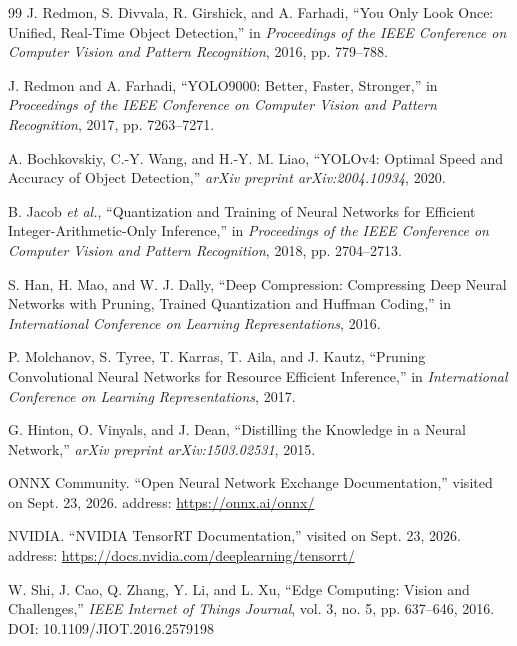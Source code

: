 \renewcommand{\bibname}{TÀI LIỆU THAM KHẢO}
\cleardoublepage
{}
\begin{thebibliography}{99}
 J. Redmon, S. Divvala, R. Girshick, and A. Farhadi, ``You Only Look
Once: Unified, Real-Time Object Detection,'' in \textit{Proceedings of the IEEE
Conference on Computer Vision and Pattern Recognition}, 2016, pp. 779--788.

 J. Redmon and A. Farhadi, ``YOLO9000: Better, Faster, Stronger,'' in
\textit{Proceedings of the IEEE Conference on Computer Vision and Pattern
Recognition}, 2017, pp. 7263--7271.

 A. Bochkovskiy, C.-Y. Wang, and H.-Y. M. Liao, ``YOLOv4: Optimal Speed
and Accuracy of Object Detection,'' \textit{arXiv preprint arXiv:2004.10934}, 2020.

 B. Jacob \textit{et al.}, ``Quantization and Training of Neural Networks for Efficient
Integer-Arithmetic-Only Inference,'' in \textit{Proceedings of the IEEE Conference
on Computer Vision and Pattern Recognition}, 2018, pp. 2704--2713.

 S. Han, H. Mao, and W. J. Dally, ``Deep Compression: Compressing Deep
Neural Networks with Pruning, Trained Quantization and Huffman Coding,''
in \textit{International Conference on Learning Representations}, 2016.

 P. Molchanov, S. Tyree, T. Karras, T. Aila, and J. Kautz,
``Pruning Convolutional Neural Networks for Resource Efficient Inference,''
in \textit{International Conference on Learning Representations}, 2017.

 G. Hinton, O. Vinyals, and J. Dean, ``Distilling the Knowledge in a Neural
Network,'' \textit{arXiv preprint arXiv:1503.02531}, 2015.

 ONNX Community. ``Open Neural Network Exchange Documentation,''
visited on Sept. 23, 2026. address: \url{https://onnx.ai/onnx/}

 NVIDIA. ``NVIDIA TensorRT Documentation,'' visited on Sept. 23, 2026.
address: \url{https://docs.nvidia.com/deeplearning/tensorrt/}

 W. Shi, J. Cao, Q. Zhang, Y. Li, and L. Xu, ``Edge Computing: Vision and
Challenges,'' \textit{IEEE Internet of Things Journal}, vol. 3, no. 5, pp. 637--646,
2016. DOI: 10.1109/JIOT.2016.2579198


\end{thebibliography}
